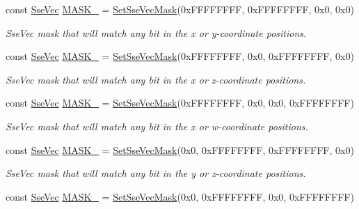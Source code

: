 \begin{DoxyCompactItemize}
const \hyperlink{namespacegofxmath_a634570ddcd2496053ee966227080e02f}{Sse\+Vec} \hyperlink{namespacegofxmath_aa909e3bfeab0b420da664a23efb26895}{M\+A\+S\+K\+\_} = \hyperlink{namespacegofxmath_a00fde6f7347c3610a9b6184079d6490e}{Set\+Sse\+Vec\+Mask}(0x\+F\+F\+F\+F\+F\+F\+F\+F, 0x\+F\+F\+F\+F\+F\+F\+F\+F, 0x0, 0x0)
\begin{DoxyCompactList}\small\item\em Sse\+Vec mask that will match any bit in the x or y-\/coordinate positions. \end{DoxyCompactList}\item 
const \hyperlink{namespacegofxmath_a634570ddcd2496053ee966227080e02f}{Sse\+Vec} \hyperlink{namespacegofxmath_ac0b117ecea85861132b3f5bb90629497}{M\+A\+S\+K\+\_} = \hyperlink{namespacegofxmath_a00fde6f7347c3610a9b6184079d6490e}{Set\+Sse\+Vec\+Mask}(0x\+F\+F\+F\+F\+F\+F\+F\+F, 0x0, 0x\+F\+F\+F\+F\+F\+F\+F\+F, 0x0)
\begin{DoxyCompactList}\small\item\em Sse\+Vec mask that will match any bit in the x or z-\/coordinate positions. \end{DoxyCompactList}\item 
const \hyperlink{namespacegofxmath_a634570ddcd2496053ee966227080e02f}{Sse\+Vec} \hyperlink{namespacegofxmath_a689cc233b7fa8e315c8cc38f474677df}{M\+A\+S\+K\+\_} = \hyperlink{namespacegofxmath_a00fde6f7347c3610a9b6184079d6490e}{Set\+Sse\+Vec\+Mask}(0x\+F\+F\+F\+F\+F\+F\+F\+F, 0x0, 0x0, 0x\+F\+F\+F\+F\+F\+F\+F\+F)
\begin{DoxyCompactList}\small\item\em Sse\+Vec mask that will match any bit in the x or w-\/coordinate positions. \end{DoxyCompactList}\item 
const \hyperlink{namespacegofxmath_a634570ddcd2496053ee966227080e02f}{Sse\+Vec} \hyperlink{namespacegofxmath_af23b97e8acce0ac2474bef3510e8dea3}{M\+A\+S\+K\+\_} = \hyperlink{namespacegofxmath_a00fde6f7347c3610a9b6184079d6490e}{Set\+Sse\+Vec\+Mask}(0x0, 0x\+F\+F\+F\+F\+F\+F\+F\+F, 0x\+F\+F\+F\+F\+F\+F\+F\+F, 0x0)
\begin{DoxyCompactList}\small\item\em Sse\+Vec mask that will match any bit in the y or z-\/coordinate positions. \end{DoxyCompactList}\item 
const \hyperlink{namespacegofxmath_a634570ddcd2496053ee966227080e02f}{Sse\+Vec} \hyperlink{namespacegofxmath_a64d1694904be595e301c48b51810b43d}{M\+A\+S\+K\+\_} = \hyperlink{namespacegofxmath_a00fde6f7347c3610a9b6184079d6490e}{Set\+Sse\+Vec\+Mask}(0x0, 0x\+F\+F\+F\+F\+F\+F\+F\+F, 0x0, 0x\+F\+F\+F\+F\+F\+F\+F\+F)

\end{DoxyCompactItemize}
